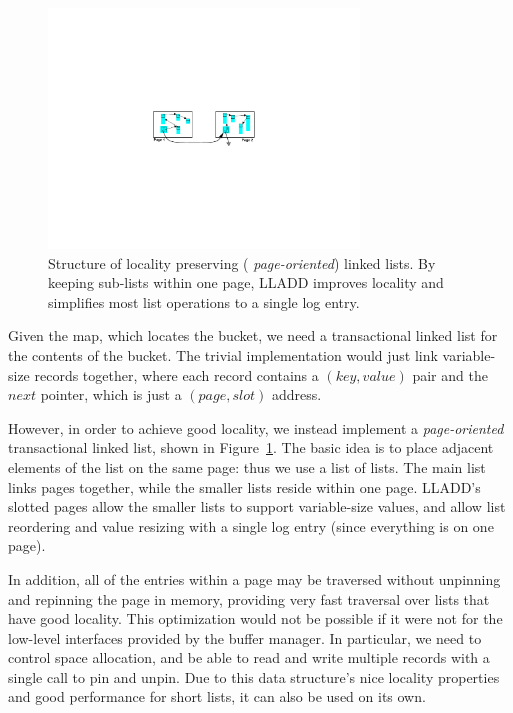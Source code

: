 \documentclass[10pt,letterpaper,twocolumn,english]{article}
\newcommand{\yad}{LLADD\xspace}
\begin{document}
\begin{figure}
\includegraphics[width=3.25in]{../paper2/LHT2.pdf}
\vspace{-12pt}
\caption{\sf\label{fig:LHT}Structure of locality preserving ({\em
page-oriented}) linked lists. By keeping sub-lists within one page,
\yad improves locality and simplifies most list operations to a single
log entry.}
\end{figure}

Given the map, which locates the bucket, we need a transactional
linked list for the contents of the bucket.  The trivial implementation
would just link variable-size records together, where each record
contains a $(key,value)$ pair and the $next$ pointer, which is just a
$(page,slot)$ address.

However, in order to achieve good locality, we instead implement a
{\em page-oriented} transactional linked list, shown in
Figure~\ref{fig:LHT}.  The basic idea is to place adjacent elements of
the list on the same page: thus we use a list of lists. The main list
links pages together, while the smaller lists reside within one
page. \yad's slotted pages allow the smaller lists to support
variable-size values, and allow list reordering and value resizing
with a single log entry (since everything is on one page).

In addition, all of the entries within a page may be traversed without
unpinning and repinning the page in memory, providing very fast
traversal over lists that have good locality.  This optimization would
not be possible if it were not for the low-level interfaces provided
by the buffer manager.
In particular, we need to control space
allocation, and be able to read and write multiple records with a
single call to pin and unpin.  Due to this data structure's nice locality
properties and good performance for short lists, it can also be used
on its own.
\end{document}

